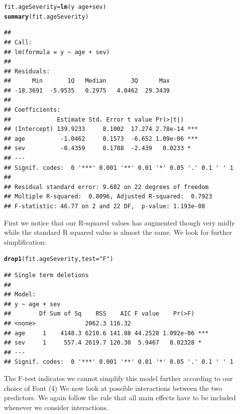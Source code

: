 \documentclass{article}\usepackage[]{graphicx}\usepackage[]{color}
\makeatletter
\newcommand{\hlstr}[1]{\textcolor[rgb]{0.192,0.494,0.8}{#1}}%
\newcommand{\hlopt}[1]{\textcolor[rgb]{0,0,0}{#1}}%
\newcommand{\hlstd}[1]{\textcolor[rgb]{0.345,0.345,0.345}{#1}}%
\newcommand{\hlkwb}[1]{\textcolor[rgb]{0.69,0.353,0.396}{#1}}%
\newcommand{\hlkwc}[1]{\textcolor[rgb]{0.333,0.667,0.333}{#1}}%
\newcommand{\hlkwd}[1]{\textcolor[rgb]{0.737,0.353,0.396}{\textbf{#1}}}%
\newenvironment{kframe}{%
 \def\at@end@of@kframe{}%
 \ifinner\ifhmode%
  \def\at@end@of@kframe{\end{minipage}}%
  \begin{minipage}{\columnwidth}%
 \fi\fi%
 \def\FrameCommand##1{\hskip\@totalleftmargin \hskip-\fboxsep
 \colorbox{shadecolor}{##1}\hskip-\fboxsep
     \hskip-\linewidth \hskip-\@totalleftmargin \hskip\columnwidth}%
 \MakeFramed {\advance\hsize-\width
   \@totalleftmargin\z@ \linewidth\hsize
   \@setminipage}}%
 {\par\unskip\endMakeFramed%
 \at@end@of@kframe}
\newenvironment{knitrout}{}{} %
\makeatother
\begin{document}
\begin{knitrout}
\color{fgcolor}\begin{kframe}
\begin{alltt}
\hlstd{fit.ageSeverity} \hlkwb{=} \hlkwd{lm}\hlstd{(y} \hlopt{~} \hlstd{age} \hlopt{+} \hlstd{sev)}
\hlkwd{summary}\hlstd{(fit.ageSeverity)}
\end{alltt}
\begin{verbatim}
## 
## Call:
## lm(formula = y ~ age + sev)
## 
## Residuals:
##      Min       1Q   Median       3Q      Max 
## -18.3691  -5.9535   0.2975   4.0462  29.3439 
## 
## Coefficients:
##             Estimate Std. Error t value Pr(>|t|)    
## (Intercept) 139.9233     8.1002  17.274 2.78e-14 ***
## age          -1.0462     0.1573  -6.652 1.09e-06 ***
## sev          -0.4359     0.1788  -2.439   0.0233 *  
## ---
## Signif. codes:  0 '***' 0.001 '**' 0.01 '*' 0.05 '.' 0.1 ' ' 1
## 
## Residual standard error: 9.682 on 22 degrees of freedom
## Multiple R-squared:  0.8096,	Adjusted R-squared:  0.7923 
## F-statistic: 46.77 on 2 and 22 DF,  p-value: 1.193e-08
\end{verbatim}
\end{kframe}
\end{knitrout}
First we notice that our R-squared values has augmented though very midly while the standard R squared value is almost the same. We look for further simplification:
\begin{knitrout}
\color{fgcolor}\begin{kframe}
\begin{alltt}
\hlkwd{drop1}\hlstd{(fit.ageSeverity,} \hlkwc{test} \hlstd{=} \hlstr{"F"}\hlstd{)}
\end{alltt}
\begin{verbatim}
## Single term deletions
## 
## Model:
## y ~ age + sev
##        Df Sum of Sq    RSS    AIC F value    Pr(>F)    
## <none>              2062.3 116.32                      
## age     1    4148.3 6210.6 141.88 44.2528 1.092e-06 ***
## sev     1     557.4 2619.7 120.30  5.9467   0.02328 *  
## ---
## Signif. codes:  0 '***' 0.001 '**' 0.01 '*' 0.05 '.' 0.1 ' ' 1
\end{verbatim}
\end{kframe}
\end{knitrout}
The F-test indicates we cannot simplify this model further according to our choice of Fout (4)
We now look at possible interactions between the two predictors. We again follow the rule that all main effects have to be included whenever we consider interactions. 
\end{document}
